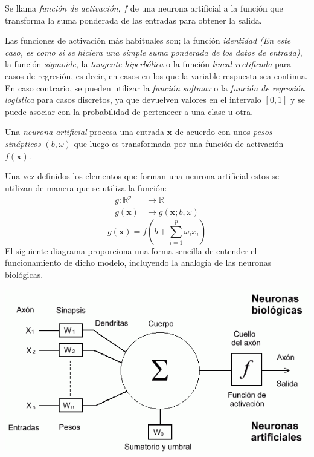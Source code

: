 \begin{defi}
Se llama \emph{función de activación}, $f$ de una neurona artificial a la función que transforma la suma ponderada de las entradas para obtener la salida. 

\noindent Las funciones de activación más habituales son; la función \emph{identidad} \emph{(En este caso, es como si se hiciera una simple suma ponderada de los datos de entrada)}, la función \emph{sigmoide}, la \emph{tangente hiperbólica} o la función \emph{lineal rectificada} para casos de regresión, es decir, en casos en los que la variable respuesta sea continua. En caso contrario, se pueden utilizar la \emph{función softmax} o la \emph{función de regresión logística} para casos discretos, ya que devuelven valores en el intervalo $[0,1]$ y se puede asociar con la probabilidad de pertenecer a una clase u otra. 
\end{defi}
\begin{defi}
Una \emph{neurona artificial} procesa una entrada $\textbf{x}$ de acuerdo con unos \emph{pesos sinápticos} $(b,\omega)$ que luego es transformada por una función de activación $f(\mathbf{x})$.

\noindent Una  vez definidos los elementos que forman una neurona artificial estos se utilizan de manera que se utiliza la función:
\begin{equation}
\begin{split}
g:\mathbb{R}^p &\longrightarrow \mathbb{R}\\
g(\textbf{x})&\longrightarrow g(\textbf{x};b,\omega)
\end{split}
\end{equation}
\begin{equation}
g(\textbf{x})=f\left(b+\sum_{i=1}^p \omega_i x_i\right)
\end{equation}
El siguiente diagrama proporciona una forma sencilla de entender el funcionamiento de dicho modelo, incluyendo la analogía de las neuronas biológicas. 
\end{defi}
\begin{center}
\includegraphics[scale=0.6]{Documentos Extra/Imagenes/neurona.png}
\end{center}

